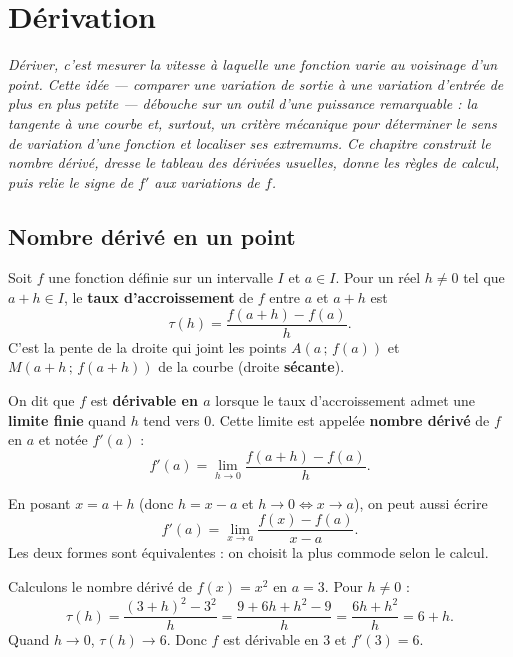\chapter{Dérivation}
\textit{Dériver, c'est mesurer la vitesse à laquelle une fonction varie au voisinage
d'un point. Cette idée — comparer une variation de sortie à une variation d'entrée
de plus en plus petite — débouche sur un outil d'une puissance remarquable : la
\emph{tangente} à une courbe et, surtout, un critère mécanique pour déterminer le
sens de variation d'une fonction et localiser ses extremums. Ce chapitre construit
le nombre dérivé, dresse le tableau des dérivées usuelles, donne les règles de
calcul, puis relie le signe de $f'$ aux variations de $f$.}

\section{Nombre dérivé en un point}

\begin{definition}
Soit $f$ une fonction définie sur un intervalle $I$ et $a\in I$. Pour un réel $h\neq 0$
tel que $a+h\in I$, le \textbf{taux d'accroissement} de $f$ entre $a$ et $a+h$ est
\[ \tau(h)=\frac{f(a+h)-f(a)}{h}. \]
C'est la pente de la droite qui joint les points $A(a\,;\,f(a))$ et $M(a+h\,;\,f(a+h))$
de la courbe (droite \textbf{sécante}).
\end{definition}

\begin{definition}
On dit que $f$ est \textbf{dérivable en $a$} lorsque le taux d'accroissement admet une
\textbf{limite finie} quand $h$ tend vers $0$. Cette limite est appelée
\textbf{nombre dérivé} de $f$ en $a$ et notée $f'(a)$ :
\[ f'(a)=\lim_{h\to 0}\frac{f(a+h)-f(a)}{h}. \]
\end{definition}

\begin{remarque}
En posant $x=a+h$ (donc $h=x-a$ et $h\to 0 \iff x\to a$), on peut aussi écrire
\[ f'(a)=\lim_{x\to a}\frac{f(x)-f(a)}{x-a}. \]
Les deux formes sont équivalentes : on choisit la plus commode selon le calcul.
\end{remarque}

\begin{exemple}
Calculons le nombre dérivé de $f(x)=x^2$ en $a=3$. Pour $h\neq 0$ :
\[ \tau(h)=\frac{(3+h)^2-3^2}{h}=\frac{9+6h+h^2-9}{h}=\frac{6h+h^2}{h}=6+h. \]
Quand $h\to 0$, $\tau(h)\to 6$. Donc $f$ est dérivable en $3$ et $f'(3)=6$.
\end{exemple}


